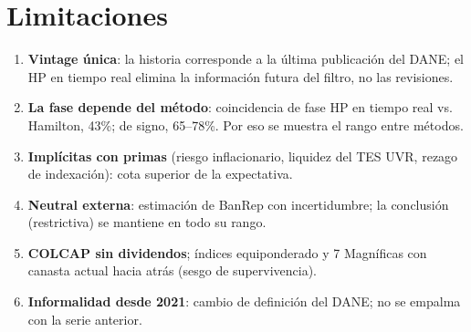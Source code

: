 \documentclass[11pt]{article}
\begin{document}
\section{Limitaciones}
\label{sec:limites}
\begin{enumerate}
\item \textbf{Vintage única}: la historia corresponde a la última publicación del DANE; el HP en tiempo real elimina
la información futura del filtro, no las revisiones.
\item \textbf{La fase depende del método}: coincidencia de fase HP en tiempo real vs. Hamilton, 43\%; de signo, 65–78\%.
Por eso se muestra el rango entre métodos.
\item \textbf{Implícitas con primas} (riesgo inflacionario, liquidez del TES UVR, rezago de indexación): cota superior de la expectativa.
\item \textbf{Neutral externa}: estimación de BanRep con incertidumbre; la conclusión (restrictiva) se mantiene en todo su rango.
\item \textbf{COLCAP sin dividendos}; índices equiponderado y 7 Magníficas con canasta actual hacia atrás (sesgo de supervivencia).
\item \textbf{Informalidad desde 2021}: cambio de definición del DANE; no se empalma con la serie anterior.
\end{enumerate}

\end{document}
